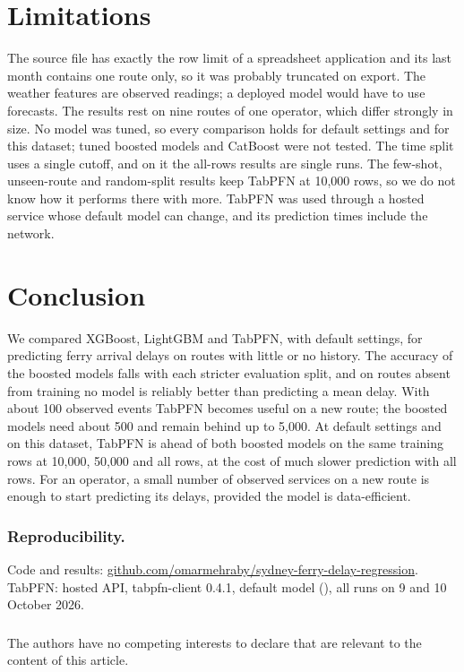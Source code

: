 \documentclass[runningheads]{llncs}
\begin{document}
\section{Limitations}
\label{sec:limitations}
The source file has exactly the row limit of a spreadsheet application and
its last month contains one route only, so it was probably truncated on
export. The weather features are
observed readings; a deployed model would have to use forecasts. The results
rest on nine routes of one operator, which differ strongly in size.
No model was tuned, so every comparison holds for default settings and for
this dataset; tuned boosted models and CatBoost were not tested. The time
split uses a single cutoff, and on it the all-rows results are single runs.
The few-shot, unseen-route and random-split results keep TabPFN at 10{,}000
rows, so we do not know how it performs there with more. TabPFN was used
through a hosted service whose default model can change, and its prediction
times include the network.

\section{Conclusion}
We compared XGBoost, LightGBM and TabPFN, with default settings, for
predicting ferry arrival delays on routes with little or no history. The
accuracy of the boosted models falls with each stricter evaluation split,
and on routes absent from training no model is reliably better than
predicting a mean delay. With about 100 observed events TabPFN becomes
useful on a new route; the boosted models need about 500 and remain behind
up to 5{,}000. At default settings and on this dataset, TabPFN is ahead of
both boosted models on the same training rows at 10{,}000, 50{,}000 and all
rows, at the cost of much slower prediction with all rows.
For an operator, a small number of observed services on a new route is
enough to start predicting its delays, provided the model is data-efficient.


\begin{credits}\sloppy
\subsubsection{Reproducibility.}
Code and results:
\url{github.com/omarmehraby/sydney-ferry-delay-regression}. TabPFN:
hosted API, tabpfn-client 0.4.1, default model (\ServedModel{}), all runs on
9 and 10 October 2026.

\subsubsection{\discintname} The authors have no competing interests to
declare that are relevant to the content of this article.
\end{credits}



\end{document}
